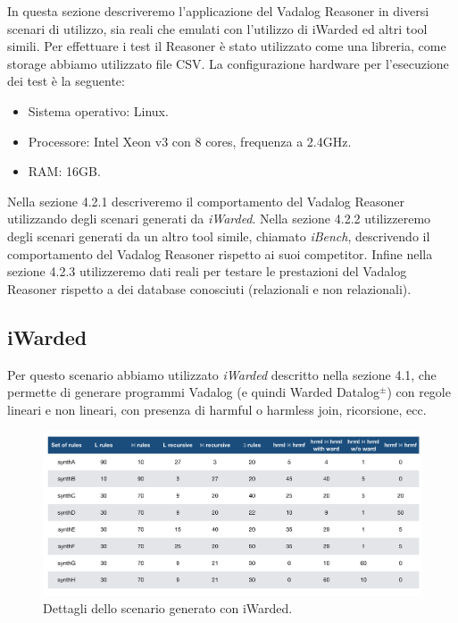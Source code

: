 In questa sezione descriveremo l'applicazione del Vadalog Reasoner in diversi scenari di utilizzo, sia reali che emulati con l'utilizzo di iWarded ed altri tool simili.\newline
Per effettuare i test il Reasoner è stato utilizzato come una libreria, come storage abbiamo utilizzato file CSV. \newline
La configurazione hardware per l'esecuzione dei test è la seguente:
\begin{itemize}
	\item Sistema operativo: Linux.
	\item Processore: Intel Xeon v3 con 8 cores, frequenza a 2.4GHz.
	\item RAM: 16GB.
\end{itemize}
Nella sezione 4.2.1 descriveremo il comportamento del Vadalog Reasoner utilizzando degli scenari generati da \emph{iWarded}. \newline
Nella sezione 4.2.2 utilizzeremo degli scenari generati da un altro tool simile, chiamato \emph{iBench}, descrivendo il comportamento del Vadalog Reasoner rispetto ai suoi competitor. \newline
Infine nella sezione 4.2.3 utilizzeremo dati reali per testare le prestazioni del Vadalog Reasoner rispetto a dei database conosciuti (relazionali e non relazionali).

\subsection{iWarded}

Per questo scenario abbiamo utilizzato \emph{iWarded} descritto nella sezione 4.1, che permette di generare programmi Vadalog (e quindi Warded Datalog$^\pm$) con regole lineari e non lineari, con presenza di harmful o harmless join, ricorsione, ecc. \newline
\begin{figure}[h]
	\centering
	\includegraphics[width=0.8\linewidth]{figure/iWardedScenario}
	\caption{Dettagli dello scenario generato con iWarded.}
	\label{fig:iwarded}
\end{figure}

